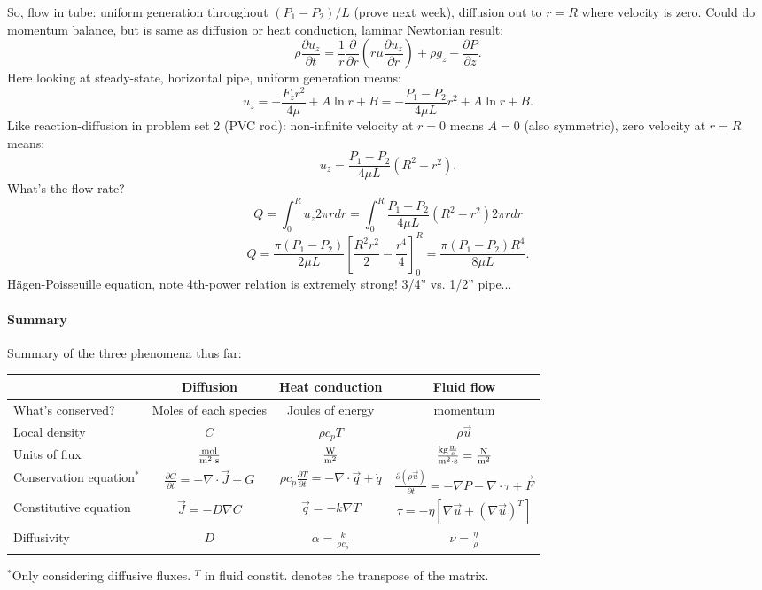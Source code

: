\documentclass{report}
\begin{document}
So, flow in tube: uniform generation throughout $(P_1-P_2)/L$ (prove next
week), diffusion out to $r=R$ where velocity is zero.  Could do momentum
balance, but is same as diffusion or heat conduction, laminar Newtonian result:
$$\rho\frac{\partial u_z}{\partial t} = \frac{1}{r}\frac{\partial}{\partial r}
\left(r\mu\frac{\partial u_z}{\partial r}\right) + \rho g_z - \frac{\partial
  P}{\partial z}.$$
Here looking at steady-state, horizontal pipe, uniform generation means:
$$u_z = -\frac{F_z r^2}{4\mu} + A\ln r + B = -\frac{P_1-P_2}{4\mu L}r^2 + A\ln
r + B.$$
Like reaction-diffusion in problem set 2 (PVC rod): non-infinite velocity at
$r=0$ means $A=0$ (also symmetric), zero velocity at $r=R$ means:
$$u_z = \frac{P_1-P_2}{4\mu L}(R^2-r^2).$$
What's the flow rate?
$$Q = \int_0^R u_z 2\pi r dr = \int_0^R \frac{P_1-P_2}{4\mu L}(R^2-r^2) 2\pi r
dr$$
$$Q = \frac{\pi(P_1-P_2)}{2\mu L} \left[\frac{R^2r^2}{2} -
  \frac{r^4}{4}\right]_0^R = \frac{\pi(P_1-P_2)R^4}{8\mu L}.$$
H\"{a}gen-Poisseuille equation, note 4th-power relation is extremely strong!
3/4'' vs. 1/2'' pipe...

\paragraph{Summary} Summary of the three phenomena thus far:

\begin{center}
  \begin{tabular}[h]{l|c|c|c|}
                      & Diffusion & Heat conduction & Fluid flow \\ \hline
    What's conserved? & Moles of each species & Joules of energy & momentum \\
    Local density  & $C$ & $\rho c_p T$ & $\rho\vec{u}$ \\
    Units of flux & $\rm\frac{mol}{m^2\cdot s}$ & $\rm\frac{W}{m^2}$ &
      $\rm\frac{kg\frac{m}{s}}{m^2\cdot s} = \frac{N}{m^2}$ \\
    Conservation equation$^*$ &
      $\frac{\partial C}{\partial t} = -\nabla\cdot\vec{J} + G$ &
      $\rho c_p\frac{\partial T}{\partial t} = -\nabla\cdot\vec{q} + \dot{q}$ &
      $\frac{\partial(\rho\vec{u})}{\partial t} = -\nabla P - \nabla\cdot\tau +
      \vec{F}$ \\
    Constitutive equation & $\vec{J} = -D\nabla C$ & $\vec{q} = -k\nabla T$ &
      $\tau = -\eta\left[\nabla\vec{u} + (\nabla\vec{u})^T\right]$ \\
    Diffusivity & $D$ & $\alpha = \frac{k}{\rho c_p}$ &
      $\nu = \frac{\eta}{\rho}$ \\
    \hline
  \end{tabular}
\end{center}
$^*$Only considering diffusive fluxes.  $^T$ in fluid constit. denotes the
transpose of the matrix.
\end{document}
